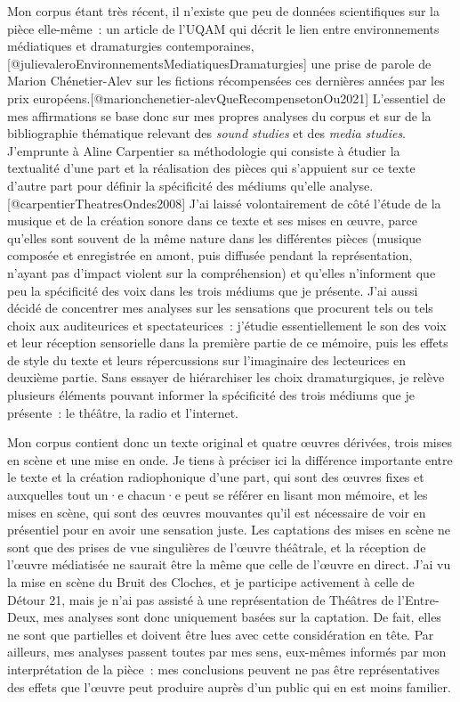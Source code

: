 \documentclass[
]{article}
\begin{document}
Mon corpus étant très récent, il n'existe que peu de données scientifiques sur la pièce elle-même~: un article de l'UQAM qui décrit le lien entre environnements médiatiques et dramaturgies contemporaines,{[}@julievaleroEnvironnementsMediatiquesDramaturgies{]} une prise de parole de Marion Chénetier-Alev sur les fictions récompensées ces dernières années par les prix européens.{[}@marionchenetier-alevQueRecompensetonOu2021{]} L'essentiel de mes affirmations se base donc sur mes propres analyses du corpus et sur de la bibliographie thématique relevant des \emph{sound studies} et des \emph{media studies}. J'emprunte à Aline Carpentier sa méthodologie qui consiste à étudier la textualité d'une part et la réalisation des pièces qui s'appuient sur ce texte d'autre part pour définir la spécificité des médiums qu'elle analyse.{[}@carpentierTheatresOndes2008{]} J'ai laissé volontairement de côté l'étude de la musique et de la création sonore dans ce texte et ses mises en œuvre, parce qu'elles sont souvent de la même nature dans les différentes pièces (musique composée et enregistrée en amont, puis diffusée pendant la représentation, n'ayant pas d'impact violent sur la compréhension) et qu'elles n'informent que peu la spécificité des voix dans les trois médiums que je présente. J'ai aussi décidé de concentrer mes analyses sur les sensations que procurent tels ou tels choix aux auditeurices et spectateurices~: j'étudie essentiellement le son des voix et leur réception sensorielle dans la première partie de ce mémoire, puis les effets de style du texte et leurs répercussions sur l'imaginaire des lecteurices en deuxième partie. Sans essayer de hiérarchiser les choix dramaturgiques, je relève plusieurs éléments pouvant informer la spécificité des trois médiums que je présente~: le théâtre, la radio et l'internet.

Mon corpus contient donc un texte original et quatre œuvres dérivées, trois mises en scène et une mise en onde. Je tiens à préciser ici la différence importante entre le texte et la création radiophonique d'une part, qui sont des œuvres fixes et auxquelles tout un·e chacun·e peut se référer en lisant mon mémoire, et les mises en scène, qui sont des œuvres mouvantes qu'il est nécessaire de voir en présentiel pour en avoir une sensation juste. Les captations des mises en scène ne sont que des prises de vue singulières de l'œuvre théâtrale, et la réception de l'œuvre médiatisée ne saurait être la même que celle de l'œuvre en direct. J'ai vu la mise en scène du Bruit des Cloches, et je participe activement à celle de Détour 21, mais je n'ai pas assisté à une représentation de Théâtres de l'Entre-Deux, mes analyses sont donc uniquement basées sur la captation. De fait, elles ne sont que partielles et doivent être lues avec cette considération en tête. Par ailleurs, mes analyses passent toutes par mes sens, eux-mêmes informés par mon interprétation de la pièce~: mes conclusions peuvent ne pas être représentatives des effets que l'œuvre peut produire auprès d'un public qui en est moins familier.
\end{document}
